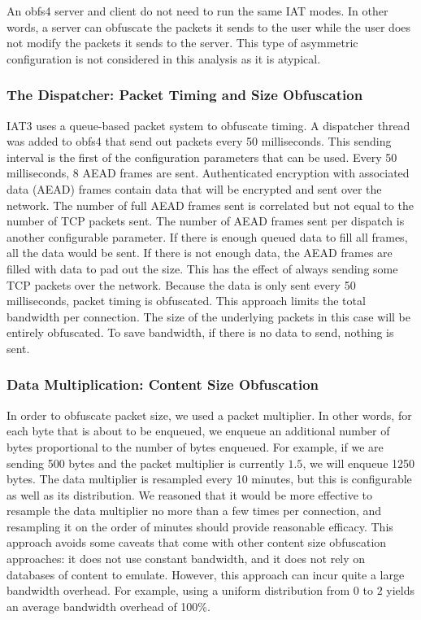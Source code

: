 \documentclass[11pt]{article}
\begin{document}
An obfs4 server and client do not need to run the same IAT modes. In other words, a server can obfuscate the packets it sends to the user while the user does not modify the packets it sends to the server. This type of asymmetric configuration is not considered in this analysis as it is atypical.

\subsubsection{The Dispatcher: Packet Timing and Size Obfuscation}
IAT3 uses a queue-based packet system to obfuscate timing. A dispatcher thread was added to obfs4 that send out packets every 50 milliseconds. This sending interval is the first of the configuration parameters that can be used. Every 50 milliseconds, 8 AEAD frames are sent. Authenticated encryption with associated data (AEAD) frames contain data that will be encrypted and sent over the network. The number of full AEAD frames sent is correlated but not equal to the number of TCP packets sent. The number of AEAD frames sent per dispatch is another configurable parameter. If there is enough queued data to fill all frames, all the data would be sent. If there is not enough data, the AEAD frames are filled with data to pad out the size. This has the effect of always sending some TCP packets over the network. Because the data is only sent every 50 milliseconds, packet timing is obfuscated. This approach limits the total bandwidth per connection. The size of the underlying packets in this case will be entirely obfuscated. To save bandwidth, if there is no data to send, nothing is sent.

\subsubsection{Data Multiplication: Content Size Obfuscation}
In order to obfuscate packet size, we used a packet multiplier. In other words, for each byte that is about to be enqueued, we enqueue an additional number of bytes proportional to the number of bytes enqueued. For example, if we are sending 500 bytes and the packet multiplier is currently $1.5$, we will enqueue 1250 bytes. The data multiplier is resampled every 10 minutes, but this is configurable as well as its distribution. We reasoned that it would be more effective to resample the data multiplier no more than a few times per connection, and resampling it on the order of minutes should provide reasonable efficacy. This approach avoids some caveats that come with other content size obfuscation approaches: it does not use constant bandwidth, and it does not rely on databases of content to emulate. However, this approach can incur quite a large bandwidth overhead. For example, using a uniform distribution from $0$ to $2$ yields an average bandwidth overhead of 100\%.
\end{document}
